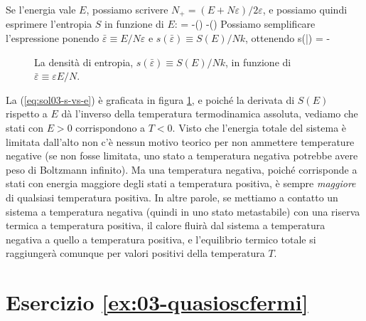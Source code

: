 Se l'energia vale $E$, possiamo scrivere $N_{+} = (E+N\varepsilon)/2\varepsilon$, e possiamo quindi esprimere l'entropia $S$ in funzione di $E$:
\be
\label{eq:SE}
 = -\ln\left(\right)
-\ln\left(\right)
\ee
Possiamo semplificare l'espressione ponendo $\bar\varepsilon \equiv E/N\varepsilon$ e $s(\bar\varepsilon) \equiv S(E)/Nk$, ottenendo
\be
\label{eq:sol03-s-vs-e}
s(\bar\varepsilon) =  - 
\ee
\begin{figure}[h]
  \label{fig:s-vs-e}
  \centering
  
  \caption{La densità di entropia, $s(\bar\varepsilon) \equiv S(E)/Nk$, in funzione di $\bar\varepsilon \equiv \varepsilon E/N$.} 
\end{figure}
\noindent
La (\ref{eq:sol03-s-vs-e}) è graficata in figura \ref{fig:s-vs-e}, e poiché la derivata di $S(E)$ rispetto a $E$ dà l'inverso della temperatura termodinamica assoluta, vediamo che stati con $E > 0$ corrispondono a $T < 0$. Visto che l'energia totale del sistema è limitata dall'alto non c'è nessun motivo teorico per non ammettere temperature negative (se non fosse limitata, uno stato a temperatura negativa potrebbe avere peso di Boltzmann infinito). Ma una temperatura negativa, poiché corrisponde a stati con energia maggiore degli stati a temperatura positiva, è sempre {\em maggiore} di qualsiasi temperatura positiva. In altre parole, se mettiamo a contatto un sistema a temperatura negativa (quindi in uno stato metastabile) con una riserva termica a temperatura positiva, il calore fluirà dal sistema a temperatura negativa a quello a temperatura positiva, e l'equilibrio termico totale si raggiungerà comunque per valori positivi della temperatura $T$.

\section*{Esercizio \ref{ex:03-quasioscfermi}}


